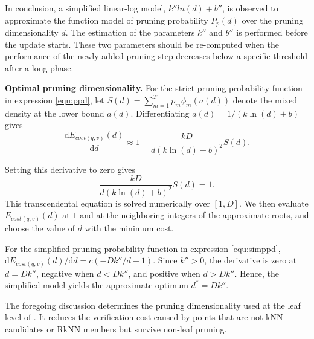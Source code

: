 In conclusion, a simplified linear-log model, $k''ln(d)+b''$, is observed to approximate the function model of pruning probability $P_p(d)$ over the pruning dimensionality $d$. The estimation of the parameters $k''$ and $b''$ is performed before the update starts. These two parameters should be re-computed when the performance of the newly added pruning step decreases below a specific threshold after a long phase.



\noindent\textbf{Optimal pruning dimensionality.}
For the strict pruning probability function in expression \ref{equ:ppd}, let $S(d)=\sum^{T}_{m=1}p_m\phi_m(a(d))$ denote the mixed density at the lower bound $a(d)$. Differentiating $a(d)=1/(k\ln(d)+b)$ gives
\begin{equation}
\frac{\mathrm{d}E_{cost(q,v)}(d)}{\mathrm{d}d}
\approx 1-\frac{kD}{d(k\ln(d)+b)^2}S(d).
\end{equation}

Setting this derivative to zero gives
\begin{equation}
\frac{kD}{d(k\ln(d)+b)^2}S(d)=1 .
\end{equation}
This transcendental equation is solved numerically over $[1,D]$. We then evaluate $E_{cost(q,v)}(d)$ at $1$ and at the neighboring integers of the approximate roots, and choose the value of $d$ with the minimum cost. 

For the simplified pruning probability function in expression \ref{equ:simppd}, $\mathrm{d}E_{cost(q,v)}(d)/\mathrm{d}d=c(-Dk''/d+1)$. Since $k''>0$, the derivative is zero at $d=Dk''$, negative when $d<Dk''$, and positive when $d>Dk''$. Hence, the simplified model yields the approximate optimum $d^*=Dk''$.

The foregoing discussion determines the pruning dimensionality used at the leaf level of \dualtree. It reduces the verification cost caused by points that are not kNN candidates or RkNN members but survive non-leaf pruning. 

























